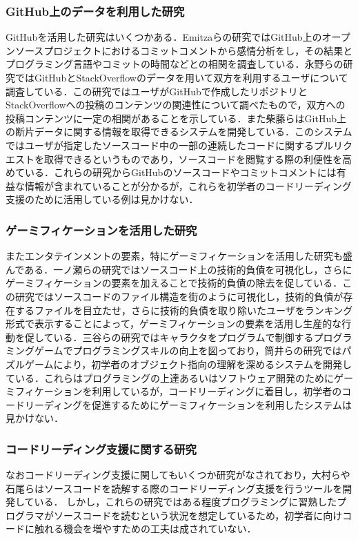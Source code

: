 \subsubsection{GitHub上のデータを利用した研究}
GitHubを活用した研究はいくつかある．Emitzaらの研究\cite{guzman}ではGitHub上のオープンソースプロジェクトにおけるコミットコメントから感情分析をし，その結果とプログラミング言語やコミットの時間などとの相関を調査している．永野らの研究\cite{nagano}ではGitHubとStackOverflowのデータを用いて双方を利用するユーザについて調査している．この研究ではユーザがGitHubで作成したリポジトリとStackOverflowへの投稿のコンテンツの関連性について調べたもので，双方への投稿コンテンツに一定の相関があることを示している．また柴藤らはGitHub上の断片データに関する情報を取得できるシステムを開発している\cite{shibatou}．このシステムではユーザが指定したソースコード中の一部の連続したコードに関するプルリクエストを取得できるというものであり，ソースコードを閲覧する際の利便性を高めている．これらの研究からGitHubのソースコードやコミットコメントには有益な情報が含まれていることが分かるが，これらを初学者のコードリーディング支援のために活用している例は見かけない．

\subsubsection{ゲーミフィケーションを活用した研究}
またエンタテインメントの要素，特にゲーミフィケーションを活用した研究も盛んである．一ノ瀬らの研究\cite{ichinose}ではソースコード上の技術的負債を可視化し，さらにゲーミフィケーションの要素を加えることで技術的負債の除去を促している．この研究ではソースコードのファイル構造を街のように可視化し，技術的負債が存在するファイルを目立たせ，さらに技術的負債を取り除いたユーザをランキング形式で表示することによって，ゲーミフィケーションの要素を活用し生産的な行動を促している．三谷らの研究\cite{mitani}ではキャラクタをプログラムで制御するプログラミングゲームでプログラミングスキルの向上を図っており，筒井らの研究\cite{tsutsui}ではパズルゲームにより，初学者のオブジェクト指向の理解を深めるシステムを開発している．これらはプログラミングの上達あるいはソフトウェア開発のためにゲーミフィケーションを利用しているが，コードリーディングに着目し，初学者のコードリーディングを促進するためにゲーミフィケーションを利用したシステムは見かけない．

\subsubsection{コードリーディング支援に関する研究}
なおコードリーディング支援に関してもいくつか研究がなされており，大村らや石尾らはソースコードを読解する際のコードリーディング支援を行うツールを開発している\cite{omura}\cite{ishio}．
しかし，これらの研究ではある程度プログラミングに習熟したプログラマがソースコードを読むという状況を想定しているため，初学者に向けコードに触れる機会を増やすための工夫は成されていない．
